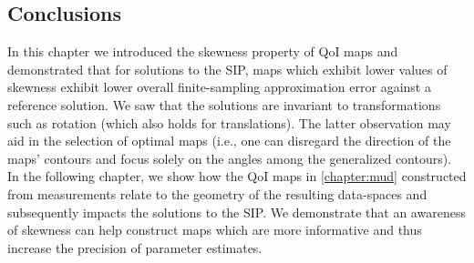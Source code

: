 
% 

% 
%
% 

\subsection{Conclusions}
In this chapter we introduced the skewness property of QoI maps and demonstrated that for solutions to the SIP, maps which exhibit lower values of skewness exhibit lower overall finite-sampling approximation error against a reference solution.
We saw that the solutions are invariant to transformations such as rotation (which also holds for translations).
The latter observation may aid in the selection of optimal maps (i.e., one can disregard the direction of the maps' contours and focus solely on the angles among the generalized contours).
In the following chapter, we show how the QoI maps in \ref{chapter:mud} constructed from measurements relate to the geometry of the resulting data-spaces and subsequently impacts the solutions to the SIP.
We demonstrate that an awareness of skewness can help construct maps which are more informative and thus increase the precision of parameter estimates.
\FloatBarrier
